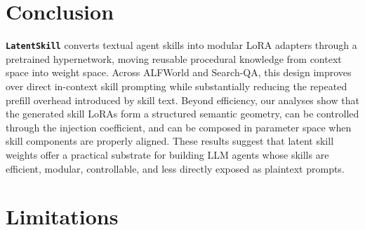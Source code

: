 \documentclass{llmxive}
\providecommand{\textttt}[1]{\texttt{#1}}
\providecommand{\method}{\textbf{\textttt{LatentSkill}}}
\begin{document}
\section{Conclusion}
\method{} converts textual agent skills into modular LoRA adapters through a pretrained hypernetwork, moving reusable procedural knowledge from context space into weight space. Across ALFWorld and Search-QA, this design improves over direct in-context skill prompting while substantially reducing the repeated prefill overhead introduced by skill text. Beyond efficiency, our analyses show that the generated skill LoRAs form a structured semantic geometry, can be controlled through the injection coefficient, and can be composed in parameter space when skill components are properly aligned. These results suggest that latent skill weights offer a practical substrate for building LLM agents whose skills are efficient, modular, controllable, and less directly exposed as plaintext prompts.
\section*{Limitations}


\end{document}
